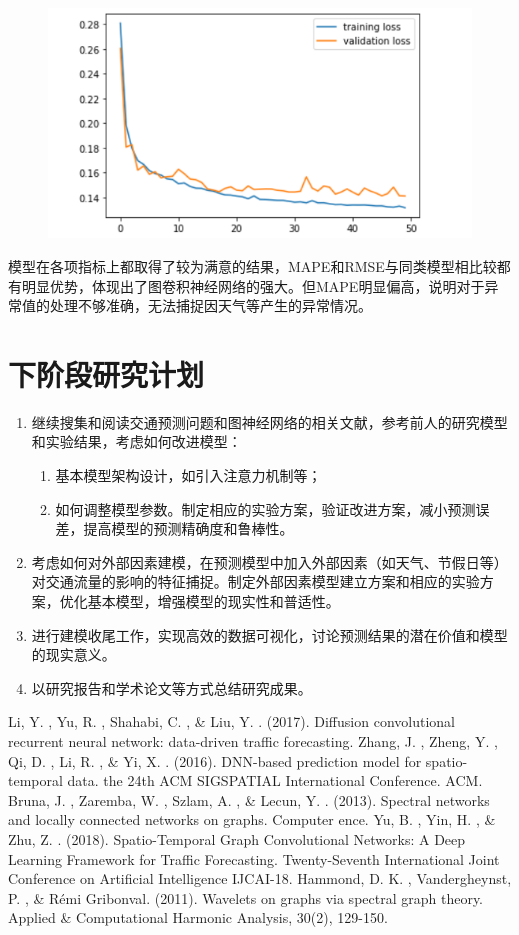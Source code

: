 \documentclass[UTF8]{ctexart}
\numberwithin{equation}{section}
\begin{document}
\begin{figure}[H]
	\centering
	\includegraphics[width=0.7\linewidth]{results}
	\label{fig:results}
\end{figure}

模型在各项指标上都取得了较为满意的结果，MAPE和RMSE与同类模型相比较都有明显优势，体现出了图卷积神经网络的强大。但MAPE明显偏高，说明对于异常值的处理不够准确，无法捕捉因天气等产生的异常情况。

\section{下阶段研究计划}
\begin{enumerate}
	\item 继续搜集和阅读交通预测问题和图神经网络的相关文献，参考前人的研究模型和实验结果，考虑如何改进模型：
	\begin{enumerate}
		\item 基本模型架构设计，如引入注意力机制等；
		\item 如何调整模型参数。制定相应的实验方案，验证改进方案，减小预测误差，提高模型的预测精确度和鲁棒性。
	\end{enumerate}
	\item 考虑如何对外部因素建模，在预测模型中加入外部因素（如天气、节假日等）对交通流量的影响的特征捕捉。制定外部因素模型建立方案和相应的实验方案，优化基本模型，增强模型的现实性和普适性。
	\item 进行建模收尾工作，实现高效的数据可视化，讨论预测结果的潜在价值和模型的现实意义。
	\item 以研究报告和学术论文等方式总结研究成果。
\end{enumerate}

\begin{thebibliography}{9}%
	Li, Y. , Yu, R. , Shahabi, C. , \& Liu, Y. . (2017). Diffusion convolutional recurrent neural network: data-driven traffic forecasting.
	Zhang, J. , Zheng, Y. , Qi, D. , Li, R. , \& Yi, X. . (2016). DNN-based prediction model for spatio-temporal data. the 24th ACM SIGSPATIAL International Conference. ACM.
	Bruna, J. , Zaremba, W. , Szlam, A. , \& Lecun, Y. . (2013). Spectral networks and locally connected networks on graphs. Computer ence.
	Yu, B. , Yin, H. , \& Zhu, Z. . (2018). Spatio-Temporal Graph Convolutional Networks: A Deep Learning Framework for Traffic Forecasting. Twenty-Seventh International Joint Conference on Artificial Intelligence IJCAI-18.
	Hammond, D. K. , Vandergheynst, P. , \& Rémi Gribonval. (2011). Wavelets on graphs via spectral graph theory. Applied \& Computational Harmonic Analysis, 30(2), 129-150.
\end{thebibliography}
\end{document}

